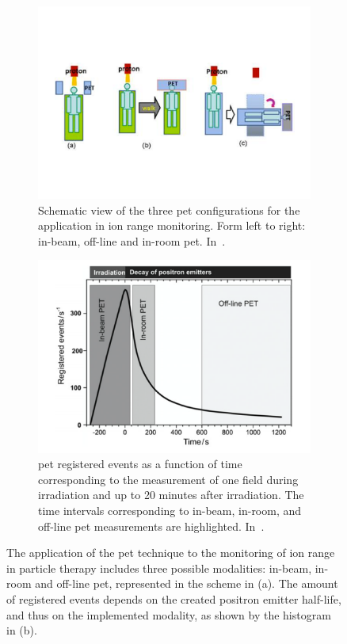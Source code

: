 \begin{figure}[!htbp]
\begin{subfigure}[t]{.49\textwidth}
\centering
\includegraphics[width=0.98\linewidth]{03_GraphicFiles/chapter1_Introduction/PETmodes.pdf}
\caption{Schematic view of the three \gls{pet} configurations for the application in ion range monitoring. Form left to right: in-beam, off-line and in-room \gls{pet}. In~\cite{Zhu2013}.}
\label{chap2::fig::PETmodes}
\end{subfigure}
\begin{subfigure}[t]{.49\textwidth}
\centering
\includegraphics[width=0.92\linewidth]{03_GraphicFiles/chapter1_Introduction/PETactDistr.pdf}
\caption{\gls{pet} registered events as a function of time corresponding to the measurement of one field during
irradiation and up to 20 minutes after irradiation. The time intervals corresponding to  in-beam, in-room, and off-line \gls{pet} measurements are highlighted. In~\cite{Shakirin2011}.}
\label{chap2::fig::PETactDistr}
\end{subfigure}
\caption{The application of the \gls{pet} technique to the monitoring of ion range in particle therapy includes three possible modalities: in-beam, in-room and off-line \gls{pet}, represented in the scheme in (a). The amount of registered events depends on the created positron emitter half-life, and thus on the implemented modality, as shown by the histogram in (b).}
\label{chap2::fig::PETmodalities}
\end{figure} 

